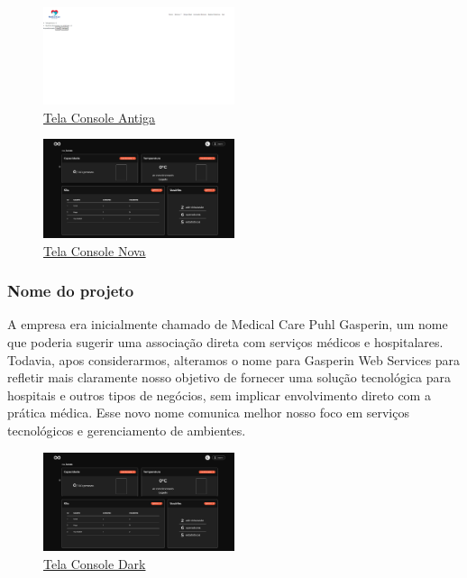 \documentclass[conference, a4paper, 12pt]{IEEEtran}
\begin{document}
\begin{figure}[H]
  \begin{center}
    \includegraphics[width=0.5\textwidth]{tempo_real_antiga.png}
    \caption{\href{https://github.com/Lucas-LPG/gws/blob/develop/report/images/tempo_real_antiga.png}{Tela Console Antiga}}
  \end{center}
\end{figure}


\begin{figure}[H]
  \begin{center}
    \includegraphics[width=0.5\textwidth]{tempo_real_novo.png}
    \caption{\href{https://github.com/Lucas-LPG/gws/blob/develop/report/images/tempo_real_novo.png}{Tela Console Nova}}
  \end{center}
\end{figure}
\vspace{10pt}


\subsubsection{Nome do projeto}

A empresa era inicialmente chamado de Medical Care Puhl Gasperin, um nome que poderia sugerir uma associação direta com serviços médicos e hospitalares. Todavia, apos considerarmos, alteramos o nome para Gasperin Web Services para refletir mais claramente nosso objetivo de fornecer uma solução tecnológica para hospitais e outros tipos de negócios, sem implicar envolvimento direto com a prática médica. Esse novo nome comunica melhor nosso foco em serviços tecnológicos e gerenciamento de ambientes.

\begin{figure}[H]
  \begin{center}
    \includegraphics[width=0.5\textwidth]{tempo_real_novo.png}
    \caption{\href{https://github.com/Lucas-LPG/gws/blob/develop/report/images/tempo_real_novo.png}{Tela Console Dark}}
  \end{center}
\end{figure}
\vspace{10pt}
\end{document}
